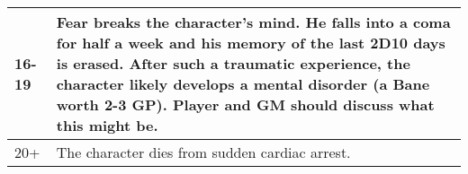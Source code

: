 \begin{tabularx}{\textwidth}{|l|X|}
	16-19  & Fear breaks the character’s mind. He falls into a coma for half a week and his memory of the last 2D10 days is erased. After such a traumatic experience, the character likely develops a mental disorder (a Bane worth 2-3 GP). Player and GM should discuss what this might be.                                                                                                    \\ \hline
	20+    & The character dies from sudden cardiac arrest.                                                                                                                                                                                                                                                                                                                                       \\ \hline
\end{tabularx}
